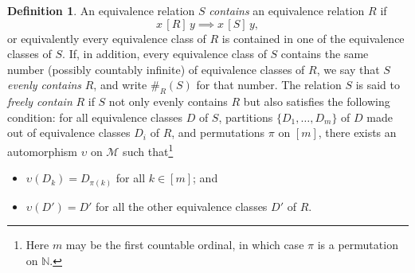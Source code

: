 \documentclass[10pt]{amsart}
\theoremstyle{definition}\newtheorem{defi}[theo]{Definition}\newtheorem{rema}[theo]{Remark}\newtheorem{exam}[theo]{Example}\newtheorem{exem}[theo]{Example}\newtheorem{nota}[theo]{Notation}
\newcommand*\MM{\mathcal{M}}
\begin{document}
\begin{defi}\label{def: freely contains}
An equivalence relation $S$ \emph{contains} an equivalence relation $R$ if
\[
x\,[R]\,y \implies x\,[S]\,y,
\]
or equivalently every equivalence class of $R$ is contained in one of the equivalence classes of $S$. If, in addition, every equivalence class of $S$ contains the same number (possibly countably infinite) of equivalence classes of $R$, we say that $S$ \emph{evenly contains} $R$, and write $\#_R(S)$ for that number. The relation $S$ is said to \emph{freely contain} $R$ if $S$ not only evenly contains $R$ but also satisfies the following condition: for all equivalence classes $D$ of $S$, partitions $\{D_1,\ldots,D_m\}$ of $D$ made out of equivalence classes $D_i$ of $R$, and permutations $\pi$ on $[m]$, there exists an automorphism $\upsilon$ on $\MM$ such that\footnote{Here $m$ may be the first countable ordinal, in which case $\pi$ is a permutation on $\mathbb{N}$.}
\begin{itemize}
\item $\upsilon(D_k) = D_{\pi(k)}$ for all $k\in [m]$; and
\item $\upsilon(D')=D'$ for all the other equivalence classes $D'$ of $R$.
\end{itemize}
\end{defi}
\end{document}
